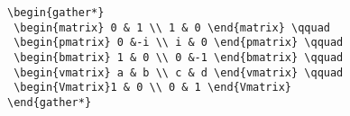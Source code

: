 \documentclass[letterpaper,12pt]{article}
\begin{document}
\pagestyle{empty}
\thispagestyle{empty}

\noindent

\begin{verbatim}
\begin{gather*}
 \begin{matrix} 0 & 1 \\ 1 & 0 \end{matrix} \qquad
 \begin{pmatrix} 0 &-i \\ i & 0 \end{pmatrix} \qquad
 \begin{bmatrix} 1 & 0 \\ 0 &-1 \end{bmatrix} \qquad
 \begin{vmatrix} a & b \\ c & d \end{vmatrix} \qquad 
 \begin{Vmatrix}1 & 0 \\ 0 & 1 \end{Vmatrix} 
\end{gather*}
\end{verbatim}
\end{document}
